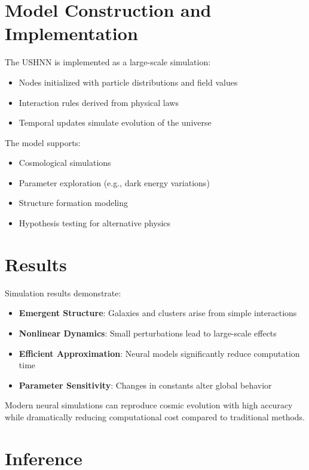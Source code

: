 \documentclass[12pt]{article}
\begin{document}
\section{Model Construction and Implementation}

The USHNN is implemented as a large-scale simulation:

\begin{itemize}
\item Nodes initialized with particle distributions and field values
\item Interaction rules derived from physical laws
\item Temporal updates simulate evolution of the universe
\end{itemize}

The model supports:

\begin{itemize}
\item Cosmological simulations
\item Parameter exploration (e.g., dark energy variations)
\item Structure formation modeling
\item Hypothesis testing for alternative physics
\end{itemize}

\section{Results}

Simulation results demonstrate:

\begin{itemize}
\item \textbf{Emergent Structure}: Galaxies and clusters arise from simple interactions
\item \textbf{Nonlinear Dynamics}: Small perturbations lead to large-scale effects
\item \textbf{Efficient Approximation}: Neural models significantly reduce computation time
\item \textbf{Parameter Sensitivity}: Changes in constants alter global behavior
\end{itemize}

Modern neural simulations can reproduce cosmic evolution with high accuracy while dramatically reducing computational cost compared to traditional methods.

\section{Inference}
\end{document}

